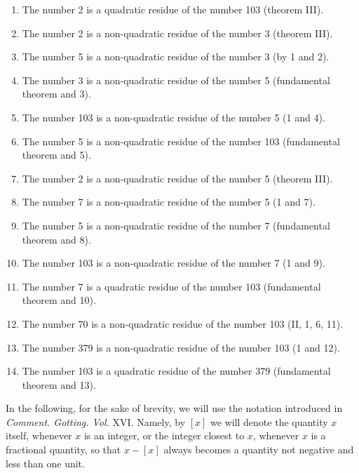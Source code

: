 \documentclass[twoside,12pt, showframe]{memoir}
\begin{document}
\begin{enumerate}
    \item The number 2 is a quadratic residue of the number 103 (theorem III).
    
    \item The number 2 is a non-quadratic residue of the number 3 (theorem III).
    
    \item The number 5 is a non-quadratic residue of the number 3 (by 1 and 2).
    
    \item The number 3 is a non-quadratic residue of the number 5 (fundamental theorem and 3).
    
    \item The number 103 is a non-quadratic residue of the number 5 (1 and 4).\clearpage\noindent%
    
    \item The number 5 is a non-quadratic residue of the number 103 (fundamental theorem and 5).
    
    \item The number 2 is a non-quadratic residue of the number 5 (theorem III).
    
    \item The number 7 is a non-quadratic residue of the number 5 (1 and 7).
    
    \item The number 5 is a non-quadratic residue of the number 7 (fundamental theorem and 8).
    
    \item The number 103 is a non-quadratic residue of the number 7 (1 and 9).
    
    \item The number 7 is a quadratic residue of the number 103 (fundamental theorem and 10).
    
    \item The number 70 is a non-quadratic residue of the number 103 (II, 1, 6, 11).
    
    \item The number 379 is a non-quadratic residue of the number 103 (1 and 12).
    
    \item The number 103 is a quadratic residue of the number 379 (fundamental theorem and 13).
\end{enumerate}
%

\(\)In the following, for the sake of brevity, we will use the notation introduced in \textit{Comment. Gotting. Vol.} XVI. Namely, by \([x]\) we will denote the quantity \(x\) itself, whenever \(x\) is an integer, or the integer closest to \(x\), whenever \(x\) is a fractional quantity, so that \(x-[x]\) always becomes a quantity not negative and less than one unit.
%
\end{document}
